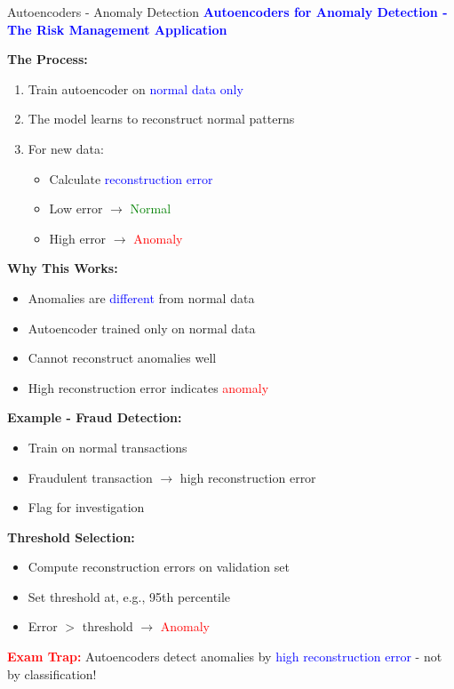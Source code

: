 \documentclass[8pt]{beamer}
\begin{document}
	\begin{frame}{Autoencoders - Anomaly Detection}
		\fontsize{6.5}{7.5}\selectfont
		\textcolor{blue}{\textbf{Autoencoders for Anomaly Detection - The Risk Management Application}}
		
		\textbf{The Process:}
		\begin{enumerate}
			\item Train autoencoder on \textcolor{blue}{normal data only}
			\item The model learns to reconstruct normal patterns
			\item For new data:
			\begin{itemize}
				\item Calculate \textcolor{blue}{reconstruction error}
				\item Low error $\rightarrow$ \textcolor{green}{Normal}
				\item High error $\rightarrow$ \textcolor{red}{Anomaly}
			\end{itemize}
		\end{enumerate}
		
		\textbf{Why This Works:}
		\begin{itemize}
			\item Anomalies are \textcolor{blue}{different} from normal data
			\item Autoencoder trained only on normal data
			\item Cannot reconstruct anomalies well
			\item High reconstruction error indicates \textcolor{red}{anomaly}
		\end{itemize}
		
		\textbf{Example - Fraud Detection:}
		\begin{itemize}
			\item Train on normal transactions
			\item Fraudulent transaction $\rightarrow$ high reconstruction error
			\item Flag for investigation
		\end{itemize}
		
		\textbf{Threshold Selection:}
		\begin{itemize}
			\item Compute reconstruction errors on validation set
			\item Set threshold at, e.g., 95th percentile
			\item Error $>$ threshold $\rightarrow$ \textcolor{red}{Anomaly}
		\end{itemize}
		
		\textcolor{red}{\textbf{Exam Trap:}} Autoencoders detect anomalies by \textcolor{blue}{high reconstruction error} - not by classification!
	\end{frame}
	
\end{document}
